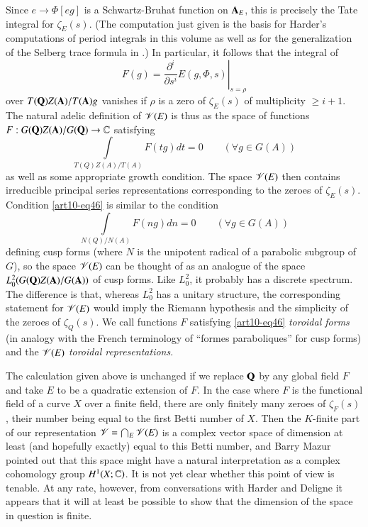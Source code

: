 Since $e \to \Phi [eg]$ is a Schwartz-Bruhat function on $\mathbf{A}_E$, this is precisely the Tate integral for $\zeta_E (s)$. (The computation just given is the basis for Harder's computations of period integrals in this volume as well as for the generalization of the Selberg trace formula in \cite{art10-4}.) In particular, it follows that the integral of 
$$
\left. F(g) = \frac{\partial^i}{\partial s^i} E (g, \Phi, s)  \right|_{s = \rho}
$$
over $T(\mathbf{Q}) Z (\mathbf{A}) / T (\mathbf{A}) g$ vanishes if $\rho$ is a zero of $\zeta_E (s)$ of multiplicity $\geqslant i +1$. The natural adelic definition of $\mathscr{V} (E)$ is thus as the space of functions $F: G (\mathbf{Q}) Z (\mathbf{A}) / G (\mathbf{Q}) \to \mathbb{C}$ satisfying
\begin{equation*}
\int\limits_{T(Q) Z (A) / T (A)} F (tg) dt = 0 \qquad (\forall g \in G (A)) \tag{46} \label{art10-eq46}
\end{equation*}
as well as some appropriate growth condition. The space $\mathscr{V} (E)$ then contains irreducible principal series representations corresponding to the zeroes of $\zeta_E (s)$. Condition \eqref{art10-eq46} is similar to the condition
$$
\int\limits_{N(Q)/ N (A)} F(ng) dn =0 \qquad (\forall g \in G (A))
$$
defining cusp forms (where $N$ is the unipotent radical of a parabolic subgroup of $G$), so the space $\mathscr{V} (E)$ can be thought of as an analogue of the space $L^2_0(G (\mathbf{Q}) Z (\mathbf{A}) / G (\mathbf{A}))$ of cusp forms. Like $L^2_0$, it probably has a discrete spectrum. The difference is that, whereas $L^2_0$ has a unitary structure, the corresponding statement for $\mathscr{V} (E)$ would imply the Riemann hypothesis and the simplicity of the zeroes of $\zeta_Q (s)$. We call functions $F$ satisfying \eqref{art10-eq46} \textit{toroidal forms} (in analogy with the French terminology of ``formes paraboliques'' for cusp forms) and the $\mathscr{V} (E)$ \textit{toroidal representations}.

The calculation given above is unchanged if we replace $\mathbf{Q}$ by any global field $F$ and take $E$ to be a quadratic extension of $F$. In the case where $F$  is the functional field of a curve $X$ over a finite field, there are only finitely many zeroes of $\zeta_F (s)$, their number being equal to the first Betti number of $X$. Then the $K$-finite part of our representation $\mathscr{V}= \bigcap_E \mathscr{V} (E)$ is a complex vector space of dimension at least (and hopefully exactly) equal to this Betti number, and Barry Mazur pointed out that this space might have a natural interpretation as a complex cohomology group $H^1 (X; \mathbb{C})$. It is not yet clear whether this point of view is tenable. At any rate, however, from conversations with Harder and Deligne it appears that it will at least be possible to show that the dimension of the space in question is finite. 

